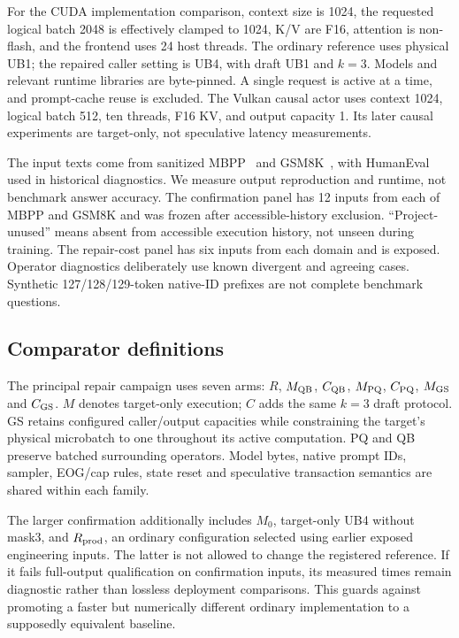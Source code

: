 For the CUDA implementation comparison, context size is 1024, the requested logical batch 2048 is effectively clamped to 1024, K/V are F16, attention is non-flash, and the frontend uses 24 host threads. The ordinary reference uses physical UB1; the repaired caller setting is UB4, with draft UB1 and $k=3$. Models and relevant runtime libraries are byte-pinned. A single request is active at a time, and prompt-cache reuse is excluded. The Vulkan causal actor uses context 1024, logical batch 512, ten threads, F16 KV, and output capacity 1. Its later causal experiments are target-only, not speculative latency measurements.

The input texts come from sanitized MBPP~\cite{mbpp} and GSM8K~\cite{gsm8k}, with HumanEval~\cite{humaneval} used in historical diagnostics. We measure output reproduction and runtime, not benchmark answer accuracy. The confirmation panel has 12 inputs from each of MBPP and GSM8K and was frozen after accessible-history exclusion. ``Project-unused'' means absent from accessible execution history, not unseen during training. The repair-cost panel has six inputs from each domain and is exposed. Operator diagnostics deliberately use known divergent and agreeing cases. Synthetic 127/128/129-token native-ID prefixes are not complete benchmark questions.

\subsection{Comparator definitions}
The principal repair campaign uses seven arms: $R$, $M_{\mathrm{QB}}$, $C_{\mathrm{QB}}$, $M_{\mathrm{PQ}}$, $C_{\mathrm{PQ}}$, $M_{\mathrm{GS}}$ and $C_{\mathrm{GS}}$. $M$ denotes target-only execution; $C$ adds the same $k=3$ draft protocol. GS retains configured caller/output capacities while constraining the target's physical microbatch to one throughout its active computation. PQ and QB preserve batched surrounding operators. Model bytes, native prompt IDs, sampler, EOG/cap rules, state reset and speculative transaction semantics are shared within each family.

The larger confirmation additionally includes $M_0$, target-only UB4 without mask3, and $R_{\rm prod}$, an ordinary configuration selected using earlier exposed engineering inputs. The latter is not allowed to change the registered reference. If it fails full-output qualification on confirmation inputs, its measured times remain diagnostic rather than lossless deployment comparisons. This guards against promoting a faster but numerically different ordinary implementation to a supposedly equivalent baseline.


